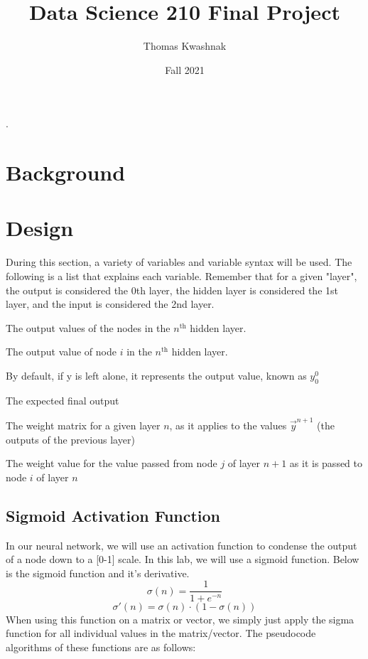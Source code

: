 \documentclass[10pt]{article}
\title{Data Science 210 Final Project}
\author{Thomas Kwashnak}
\date{Fall 2021}
\begin{document}
\maketitle
\setlength{\parindent}{0pt}.
\setlength{\parskip}{\baselineskip}
\lstset{numbers=left, numberstyle=\footnotesize, frame=l} 


\section{Background}
\section{Design}
During this section, a variety of variables and variable syntax will be used. The following is a list that explains each variable. Remember that for a given "layer", the output is considered the 0th layer, the hidden layer is considered the 1st layer, and the input is considered the 2nd layer.
\begin{description}[style=nextline]
    \item[$\vec{y}^n$] The output values of the nodes in the $n^{\text{th}}$ hidden layer. 
    \item[$y^n_i$] The output value of node $i$ in the $n^{\text{th}}$ hidden layer.
    \item[$y$] By default, if y is left alone, it represents the output value, known as $y^0_0$ 
    \item[$\hat{y}$] The expected final output 
    \item[$W^n$] The weight matrix for a given layer $n$, as it applies to the values $\vec{y}^{n+1}$ (the outputs of the previous layer) 
    \item[$w^n_{i,j}$] The weight value for the value passed from node $j$ of layer $n+1$ as it is passed to node $i$ of layer $n$
\end{description}
\subsection{Sigmoid Activation Function}
In our neural network, we will use an activation function to condense the output of a node down to a [0-1] scale. In this lab, we will use a sigmoid function. Below is the sigmoid function and it's derivative.
$$\sigma(n) = \frac{1}{1 + e^{-n}}$$
$$\sigma'(n) = \sigma(n) \cdot (1 - \sigma(n))$$
When using this function on a matrix or vector, we simply just apply the sigma function for all individual values in the matrix/vector. The pseudocode algorithms of these functions are as follows:
\end{document}
